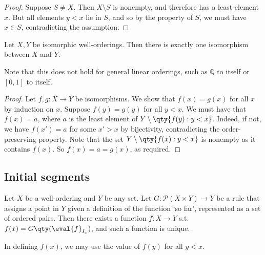 \begin{proof}
    Suppose $S \neq X$.
    Then $X \setminus S$ is nonempty, and therefore has a least element $x$.
    But all elements $y < x$ lie in $S$, and so by the property of $S$, we must have $x \in S$, contradicting the assumption.
\end{proof}

\begin{proposition}
    Let $X, Y$ be isomorphic well-orderings.
    Then there is exactly one isomorphism between $X$ and $Y$.
\end{proposition}

Note that this does not hold for general linear orderings, such as $\mathbb Q$ to itself or $[0,1]$ to itself.

\begin{proof}
    Let $f, g \colon X \to Y$ be isomorphisms.
    We show that $f(x) = g(x)$ for all $x$ by induction on $x$.
    Suppose $f(y) = g(y)$ for all $y < x$.
    We must have that $f(x) = a$, where $a$ is the least element of $Y \setminus \qty{f(y) : y < x}$.
    Indeed, if not, we have $f(x') = a$ for some $x' > x$ by bijectivity, contradicting the order-preserving property.
    Note that the set $Y \setminus \qty{f(x) : y < x}$ is nonempty as it contains $f(x)$.
    So $f(x) = a = g(x)$, as required.
\end{proof}

\subsection{Initial segments}

\begin{theorem}
    Let $X$ be a well-ordering and $Y$ be any set.
    Let $G \colon \mathcal P(X \times Y) \to Y$ be a rule that assigns a point in $Y$ given a definition of the function `so far', represented as a set of ordered pairs.
    Then there exists a function $f \colon X \to Y$ s.t. $f(x) = G\qty(\eval{f}_{I_x})$, and such a function is unique.
\end{theorem}

\begin{remark}
    In defining $f(x)$, we may use the value of $f(y)$ for all $y < x$.
\end{remark}


